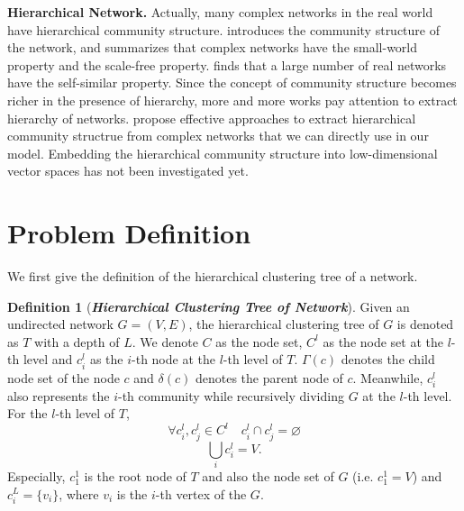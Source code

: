\documentclass{article}
\theoremstyle{definition}
\newtheorem{defn}{Definition}
\begin{document}
	 

	\textbf{Hierarchical Network.} Actually, many complex networks in the real world have hierarchical community structure. 
	\cite{newman2003structure} introduces the community structure of the network, and summarizes that complex networks have the small-world property and the scale-free property. \cite{song2005self} finds that a large number of real networks have the self-similar property. 
	Since the concept of community structure becomes richer in the presence of hierarchy, more and more works pay attention to extract hierarchy of networks.
	\cite{clauset2008hierarchical}
	\cite{Yang2013Hierarchical}\cite{sales-pardo2007extracting}\cite{Lancichinetti2008Detecting} propose effective approaches to extract hierarchical community structrue from complex networks that we can directly use in our model.
	Embedding the hierarchical community structure into low-dimensional vector spaces has not been investigated yet.

	\section{Problem Definition}
		We first give the definition of the hierarchical clustering tree \cite{clauset2008hierarchical} of a network.
		\begin{defn}[\textbf{\emph{Hierarchical Clustering Tree of Network}}]
			Given an undirected network $G = (V, E)$, the hierarchical clustering tree of $G$ is denoted as $T$ with a depth of $L$. We denote $C$ as the node set,
			$C^l$ as the node set at the $l$-th level and $c^l_i$ as the $i$-th node at the $l$-th level of $T$. $\Gamma(c)$ denotes the child node set of the node $c$ and $\delta(c)$ denotes the parent node of $c$. Meanwhile, $c^l_i$ also represents the $i$-th community while recursively dividing $G$ at the $l$-th level. For the $l$-th level of $T$,
				\[
				\forall c^l_i, c^l_j \in C^l \quad c^l_i \cap c^l_j = \varnothing
				\]
				\[
				\bigcup_i c_i^l = V.
				\]
			Especially, $c_1^1$ is the root node of $T$ and also the node set of $G$ (i.e. $c_1^1 = V$) and $c_i^L = \{v_i\}$, where $v_i$ is the $i$-th vertex of the $G$.
		\end{defn}
		
\end{document}
